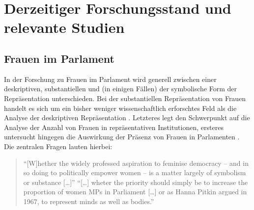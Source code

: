 \documentclass[12pt, 
    twoside=false, 
    bibliography=totoc, 
    numbers=endperiod, 
    headings=normal, 
    toc=chapterentrydotfill
    ]{scrbook}
\begin{document}


\section {Derzeitiger Forschungsstand und relevante Studien}


\subsection{Frauen im Parlament}

In der Forschung zu Frauen im Parlament wird generell zwischen einer deskriptiven, substantiellen und (in einigen Fällen) der symbolische Form der Repräsentation unterschieden. Bei der substantiellen Repräsentation von Frauen handelt es sich um ein bisher weniger wissenschaftlich erforschtes Feld als die Analyse der deskriptiven Repräsentation \parencite[59]{wangnerud_2009}. 
Letzteres legt den Schwerpunkt auf die Analyse der Anzahl von Frauen in repräsentativen Institutionen, ersteres untersucht hingegen die Auswirkung der Präsenz von Frauen in Parlamenten \parencites[14]{coffe_2013}[52]{wangnerud_2009}.
Die zentralen Fragen lauten hierbei:

\citereset
\begin{quote}
  \enquote{[W]hether the widely professed aspiration to feminise democracy -- and in so doing to politically empower women -- is a matter largely of symbolism or substance […]}
  \enquote{[…] wheter the priority should simply be to increase the proportion of women MPs in Parliament […] or as Hanna Pitkin argued in 1967, to represent minds as well as bodies.}
  \parencite[413]{blaxill_2016}
\end{quote}
\end{document}
